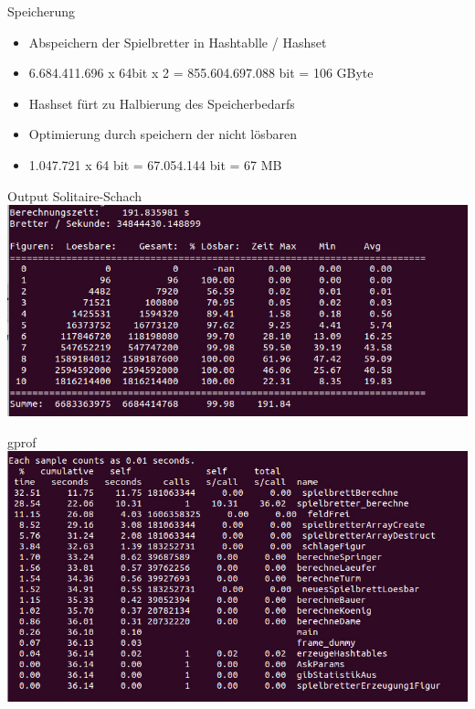 \documentclass{beamer}
\begin{document}
\begin{frame}{Speicherung}
	\begin{itemize}
		\item Abspeichern der Spielbretter in Hashtablle / Hashset
		\item 6.684.411.696 x 64bit x 2 = 855.604.697.088 bit = 106 GByte
		\item Hashset fürt zu Halbierung des Speicherbedarfs
		\item Optimierung durch speichern der nicht lösbaren 
		\item 1.047.721 x 64 bit = 67.054.144 bit = 67 MB 
	\end{itemize}
\end{frame}

\begin{frame}{Output Solitaire-Schach}
\includegraphics[scale=0.4]{output}
\end{frame}

\begin{frame}{gprof}
\includegraphics[scale=0.4]{gprof}
\end{frame}
\end{document}

